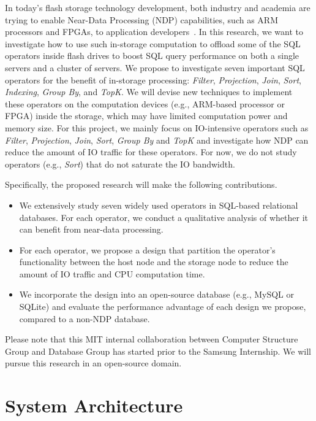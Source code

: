 \documentclass{article}
\newcommand{\filter}{\textit{Filter}\xspace}
\newcommand{\projection}{\textit{Projection}\xspace}
\newcommand{\join}{\textit{Join}\xspace}
\newcommand{\sort}{\textit{Sort}\xspace}
\newcommand{\indexing}{\textit{Indexing}\xspace}
\newcommand{\groupby}{\textit{Group By}\xspace}
\newcommand{\topk}{\textit{TopK}\xspace}
\begin{document}
In today's flash storage technology development, both industry and academia are trying to enable Near-Data Processing (NDP) capabilities, such as ARM processors and FPGAs, to application developers~\cite{biscuit, ibex, bluedbm, netezza, exadata, jafar, do2013query, sukhwani2012database, fpga-sort}.
In this research, we want to investigate how to use such in-storage computation to offload some of the SQL operators inside flash drives to boost SQL query performance on both a single servers and a cluster of servers.
We propose to investigate seven important SQL operators for the benefit of in-storage processing: \filter, \projection, \join, \sort, \indexing, \groupby, and \topk.
We will devise new techniques to implement these operators on the computation devices (e.g., ARM-based processor or FPGA) inside the storage, which may have limited computation power and memory size. 
For this project, we mainly focus on IO-intensive operators such as \filter, \projection, \join, \sort, \groupby and \topk and investigate how NDP can reduce the amount of IO traffic for these operators. 
For now, we do not study operators (e.g., \sort) that do not saturate the IO bandwidth. 

Specifically, the proposed research will make the following contributions.

\begin{itemize}
\item We extensively study seven widely used operators in SQL-based relational databases. For each operator, we conduct a qualitative analysis of whether it can benefit from near-data processing. 

\item For each operator, we propose a design that partition the operator's functionality between the host node and the storage node to reduce the amount of IO traffic and CPU computation time. 

\item We incorporate the design into an open-source database (e.g., MySQL or SQLite) and evaluate the performance advantage of each design we propose, compared to a non-NDP database. 
\end{itemize}

Please note that this MIT internal collaboration between Computer Structure Group and Database Group has started prior to the Samsung Internship. We will pursue this research in an open-source domain.

\section{System Architecture}
\end{document}
